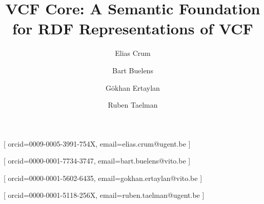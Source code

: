 \documentclass{ceurart}
\begin{document}

\title{VCF Core: A Semantic Foundation for RDF Representations of VCF}

\author[1,2]{Elias Crum}[
orcid=0009-0005-3991-754X,
email=elias.crum@ugent.be
]
\cormark[1]
\author[2]{Bart Buelens}[
orcid=0000-0001-7734-3747,
email=bart.buelens@vito.be
]
\author[2]{Gökhan Ertaylan}[
orcid=0000-0001-5602-6435,
email=gokhan.ertaylan@vito.be
]
\author[1]{Ruben Taelman}[
orcid=0000-0001-5118-256X,
email=ruben.taelman@ugent.be
]
\address[1]{IDLab, Department of Electronics and Information Systems, Ghent University -- imec, Belgium}
\address[2]{Flemish institute for Technological Research (VITO) Mol, Belgium}
\end{document}

